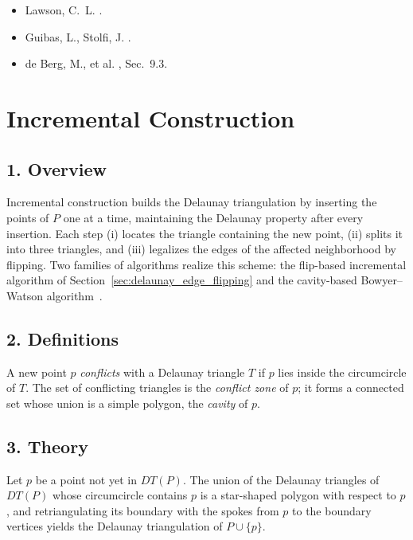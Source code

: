 \begin{itemize}
\item Lawson, C.~L. \cite{lawson1977}.
\item Guibas, L., Stolfi, J. \cite{guibas1985}.
\item de Berg, M., et al. \cite{deberg2008}, Sec.~9.3.
\end{itemize}

\section{Incremental Construction}
\label{sec:delaunay_incremental}

\subsection{1. Overview}

Incremental construction builds the Delaunay
triangulation by inserting the points of $P$ one at a time, maintaining the
Delaunay property after every insertion. Each step (i) locates the triangle
containing the new point, (ii) splits it into three triangles, and (iii)
legalizes the edges of the affected neighborhood by flipping. Two families of
algorithms realize this scheme: the flip-based incremental algorithm of
Section~\ref{sec:delaunay_edge_flipping} and the cavity-based
Bowyer--Watson algorithm~\cite{bowyer1981,watson1981}.

\subsection{2. Definitions}

\begin{definition}[Conflict]\label{def:conflict}
A new point $p$ \emph{conflicts} with a Delaunay triangle $T$ if $p$ lies
inside the circumcircle of $T$. The set of conflicting triangles is the
\emph{conflict zone} of $p$; it forms a connected set whose union is a simple
polygon, the \emph{cavity} of $p$.
\end{definition}

\subsection{3. Theory}

\begin{theorem}\label{thm:cavity}
Let $p$ be a point not yet in $DT(P)$. The union of the Delaunay triangles of
$DT(P)$ whose circumcircle contains $p$ is a star-shaped polygon with respect
to $p$, and retriangulating its boundary with the spokes from $p$ to the
boundary vertices yields the Delaunay triangulation of $P \cup \{p\}$.
\end{theorem}

